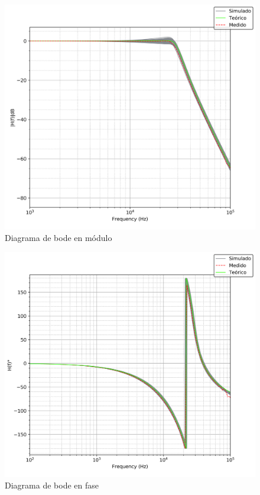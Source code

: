 \begin{figure}[H]
    \centering
    \includegraphics[scale=0.7]{../EJ1/Recursos/legendre_bode_modulo.png}
    \caption{Diagrama de bode en m\'odulo}
    \label{fig:legendre_bode_modulo}
\end{figure}

\begin{figure}[H]
    \centering
    \includegraphics[scale=0.7]{../EJ1/Recursos/legendre_bode_fase.png}
    \caption{Diagrama de bode en fase}
    \label{fig:legendre_bode_fase}
\end{figure}

